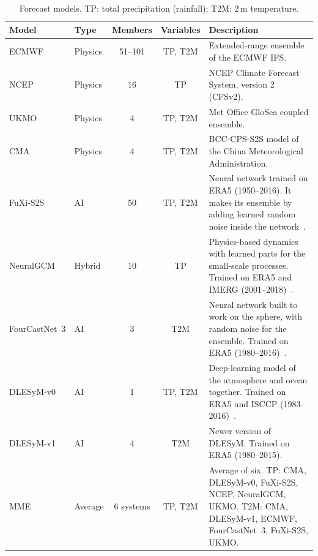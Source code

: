 \documentclass[11pt,a4paper]{article}
\begin{document}
\begin{table}[H]
\centering\footnotesize
\caption{Forecast models. TP: total precipitation (rainfall); T2M: 2\,m temperature.}
\label{tab:systems}
\renewcommand{\arraystretch}{1.0}
\begin{tabularx}{\linewidth}{@{}l l c c >{\raggedright\arraybackslash}X@{}}
\toprule
Model & Type & Members & Variables & Description \\
\midrule
ECMWF        & Physics & 51--101 & TP, T2M & Extended-range ensemble of the ECMWF IFS. \\
NCEP         & Physics & 16  & TP & NCEP Climate Forecast System, version 2 (CFSv2). \\
UKMO         & Physics & 4   & TP, T2M & Met Office GloSea coupled ensemble. \\
CMA          & Physics & 4   & TP, T2M & BCC-CPS-S2S model of the China Meteorological Administration. \\
FuXi-S2S     & AI      & 50  & TP, T2M & Neural network trained on ERA5 (1950--2016). It makes its ensemble by adding learned random noise
inside the network~\cite{chen2024fuxis2s}. \\
NeuralGCM    & Hybrid  & 10  & TP & Physics-based dynamics with learned parts for the small-scale processes. Trained on ERA5 and IMERG
(2001--2018)~\cite{kochkov2024neuralgcm}. \\
FourCastNet~3 & AI     & 3   & T2M & Neural network built to work on the sphere, with random noise for the ensemble. Trained on ERA5
(1980--2016)~\cite{bonev2025fcn3}. \\
DLESyM-v0    & AI      & 1   & TP, T2M & Deep-learning model of the atmosphere and ocean together. Trained on ERA5 and ISCCP
(1983--2016)~\cite{cresswellclay2024dlesym}. \\
DLESyM-v1    & AI      & 4   & T2M & Newer version of DLESyM. Trained on ERA5 (1980--2015). \\
MME          & Average & 6 systems & TP, T2M & Average of six. TP: CMA, DLESyM-v0, FuXi-S2S, NCEP, NeuralGCM, UKMO. T2M: CMA, DLESyM-v1, ECMWF, FourCastNet~3,
FuXi-S2S, UKMO. \\
\bottomrule
\end{tabularx}
\end{table}
\end{document}
